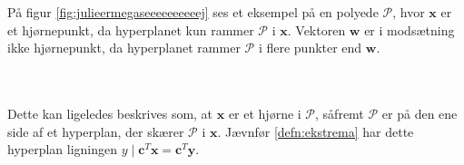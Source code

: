 \noindent
%
På figur \ref{fig:julieermegaseeeeeeeeeej} ses et eksempel på en polyede $\mathcal{P}$, hvor $\textbf{x}$ er et hjørnepunkt, da hyperplanet kun rammer $\mathcal{P}$ i $\mathbf{x}$. 
Vektoren $\textbf{w}$ er i modsætning ikke hjørnepunkt, da hyperplanet rammer $\mathcal{P}$ i flere punkter end $\mathbf{w}$.
%

\\\\
%
%
Dette kan ligeledes beskrives som, at $\mathbf{x}$ er et hjørne i $\mathcal{P}$, såfremt $\mathcal{P}$ er på den ene side af et hyperplan, der skærer $\mathcal{P}$ i $\mathbf{x}$. 
Jævnfør \ref{defn:ekstrema} har dette hyperplan ligningen $y \mid \mathbf{c}^T\mathbf{x}=\mathbf{c}^T\mathbf{y}.$